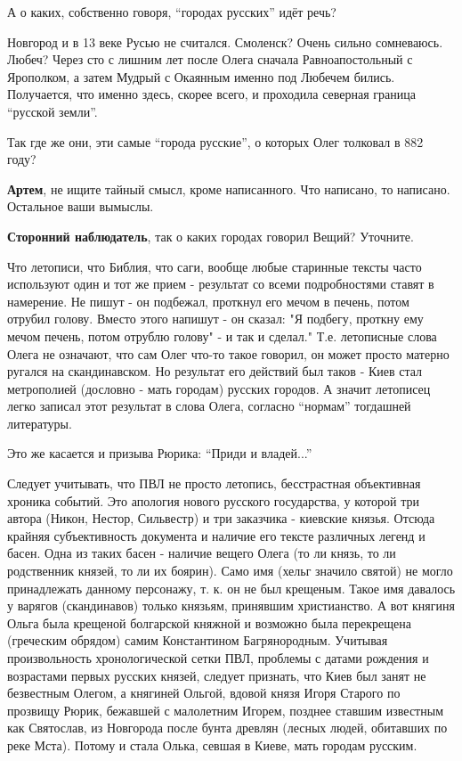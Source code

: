 \begin{itemize}
А о каких, собственно говоря, \enquote{городах русских} идёт речь?

Новгород и в 13 веке Русью не считался. Смоленск? Очень сильно сомневаюсь.
Любеч? Через сто с лишним лет после Олега сначала Равноапостольный с Ярополком,
а затем Мудрый с Окаянным именно под Любечем бились. Получается, что именно
здесь, скорее всего, и проходила северная граница \enquote{русской земли}.

Так где же они, эти самые \enquote{города русские}, о которых Олег толковал в 882 году?

\begin{itemize} %
\textbf{Артем}, не ищите тайный смысл, кроме написанного. Что написано, то написано. Остальное ваши вымыслы.

\textbf{Сторонний наблюдатель}, так о каких городах говорил Вещий? Уточните.
\end{itemize} %


Что летописи, что Библия, что саги, вообще любые старинные тексты часто
используют один и тот же прием - результат со всеми подробностями ставят в
намерение. Не пишут - он подбежал, проткнул его мечом в печень, потом отрубил
голову. Вместо этого напишут - он сказал: "Я подбегу, проткну ему мечом печень,
потом отрублю голову" - и так и сделал." Т.е. летописные слова Олега не
означают, что сам Олег что-то такое говорил, он может просто матерно ругался на
скандинавском. Но результат его действий был таков - Киев стал метрополией
(дословно - мать городам) русских городов. А значит летописец легко записал
этот результат в слова Олега, согласно \enquote{нормам} тогдашней литературы.

Это же касается и призыва Рюрика: \enquote{Приди и владей...}


Следует учитывать, что ПВЛ не просто летопись, бесстрастная объективная хроника
событий. Это апология нового русского государства, у которой три автора (Никон,
Нестор, Сильвестр) и три заказчика - киевские князья. Отсюда крайняя
субъективность документа и наличие его тексте различных легенд и басен. Одна из
таких басен - наличие вещего Олега (то ли князь, то ли родственник князей, то
ли их боярин). Само имя (хельг значило святой) не могло принадлежать данному
персонажу, т. к. он не был крещеным. Такое имя давалось у варягов (скандинавов)
только князьям, принявшим христианство. А вот княгиня Ольга была крещеной
болгарской княжной и возможно была перекрещена (греческим обрядом) самим
Константином Багрянородным. Учитывая произвольность хронологической сетки ПВЛ,
проблемы с датами рождения и возрастами первых русских князей, следует
признать, что Киев был занят не безвестным Олегом, а княгиней Ольгой, вдовой
князя Игоря Старого по прозвищу Рюрик, бежавшей с малолетним Игорем, позднее
ставшим известным как Святослав, из Новгорода после бунта древлян (лесных
людей, обитавших по реке Мста). Потому и стала Олька, севшая в Киеве, мать
городам русским.


\end{itemize}
